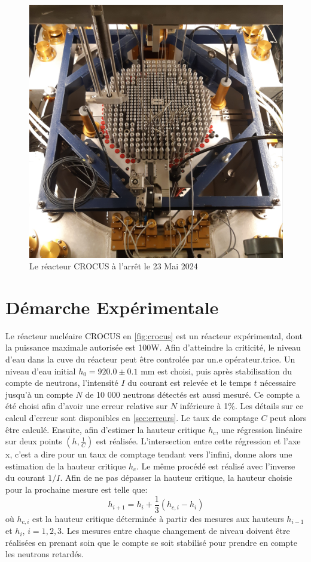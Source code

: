 \begin{figure}
    \includegraphics*[width=\linewidth]{figures/crocus.jpg}
    \caption{Le réacteur CROCUS à l'arrêt le 23 Mai 2024}
    \label{fig:crocus}
\end{figure}
\section{Démarche Expérimentale}
Le réacteur nucléaire CROCUS en \autoref{fig:crocus} est un réacteur expérimental, dont la puissance maximale autorisée est 100W. Afin d'atteindre la criticité, le niveau d'eau dans la cuve du réacteur peut être controlée par un.e opérateur.trice. Un niveau d'eau initial \(h_0 = 920.0 \pm 0.1\) mm est choisi, puis après stabilisation du compte de neutrons, l'intensité $I$ du courant est relevée et le temps \(t\) nécessaire jusqu'à un compte \(N\) de 10 000 neutrons détectés est aussi mesuré. Ce compte a été choisi afin d'avoir une erreur relative sur \(N\) inférieure à 1\%. Les détails sur ce calcul d'erreur sont disponibles en \autoref{sec:erreurs}. Le taux de comptage \(C\) peut alors être calculé. Ensuite, afin d'estimer la hauteur critique \(h_c\), une régression linéaire sur deux points \((h, \frac{1}{C})\) est réalisée. L'intersection entre cette régression et l'axe x, c'est a dire pour un taux de comptage tendant vers l'infini, donne alors une estimation de la hauteur critique \(h_c\). Le même procédé est réalisé avec l'inverse du courant $1/I$. Afin de ne pas dépasser la hauteur critique, la hauteur choisie pour la prochaine mesure est telle que:
\begin{equation}
    h_{i+1} = h_i + \frac{1}{3}(h_{c,i} - h_i)
\end{equation}
où \(h_{c,i}\) est la hauteur critique déterminée à partir des mesures aux hauteurs \(h_{i-1}\) et \(h_{i}\), \(i=1,2,3\). Les mesures entre chaque changement de niveau doivent être réalisées en prenant soin que le compte se soit stabilisé pour prendre en compte les neutrons retardés.

